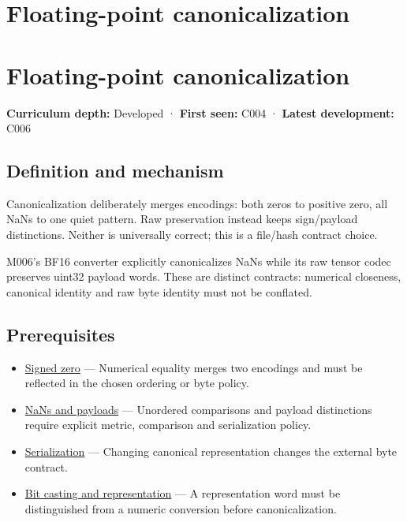 \hypertarget{appendix-e90053a4b201}{}
\section*{Floating-point canonicalization}
\section{Floating-point canonicalization}\label{floating-point-canonicalization}

\textbf{Curriculum depth:} Developed · \textbf{First seen:} C004 · \textbf{Latest development:} C006

\subsection{Definition and mechanism}\label{definition-and-mechanism}

Canonicalization deliberately merges encodings: both zeros to positive zero, all NaNs to one quiet pattern. Raw preservation instead keeps sign/payload distinctions. Neither is universally correct; this is a file/hash contract choice.

M006's BF16 converter explicitly canonicalizes NaNs while its raw tensor codec preserves uint32 payload words. These are distinct contracts: numerical closeness, canonical identity and raw byte identity must not be conflated.

\subsection{Prerequisites}\label{prerequisites}

\begin{itemize}
\tightlist
\item
  \hyperref[appendix-3a048f032c1f]{Signed zero} --- Numerical equality merges two encodings and must be reflected in the chosen ordering or byte policy.
\item
  \hyperref[appendix-d6607cc4c235]{NaNs and payloads} --- Unordered comparisons and payload distinctions require explicit metric, comparison and serialization policy.
\item
  \hyperref[appendix-91d09ebed979]{Serialization} --- Changing canonical representation changes the external byte contract.
\item
  \hyperref[appendix-34ee45f161c1]{Bit casting and representation} --- A representation word must be distinguished from a numeric conversion before canonicalization.
\end{itemize}

